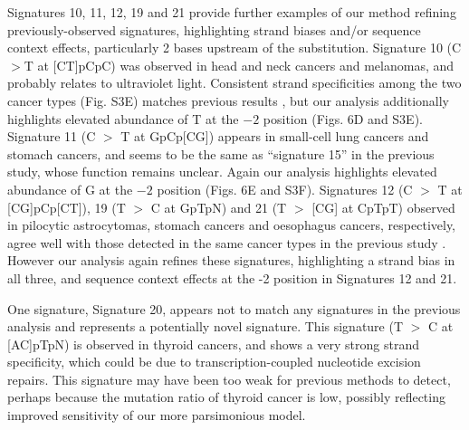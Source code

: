 \documentclass[10pt,letterpaper]{article}
\begin{document}
Signatures 10, 11, 12, 19 and 21 provide further examples
of our method refining previously-observed signatures, highlighting strand biases and/or sequence context effects,
particularly 2 bases upstream of the substitution.
Signature 10 (C $>$T at [CT]pCpC) was observed in head and neck cancers and melanomas, and probably relates to ultraviolet light.
Consistent strand specificities among the two cancer types (Fig. S3E) matches previous results \cite{pmid23318258}, 
but our analysis additionally highlights elevated abundance of T at the $-2$ position (Figs. 6D and S3E). 
Signature 11 (C $>$ T at GpCp[CG]) appears in small-cell lung cancers and stomach cancers,
and seems to be the same as ``signature 15'' in the previous study, whose function remains unclear. Again our analysis highlights elevated abundance of G at the $-2$ position (Figs. 6E and S3F).
Signatures 12 (C $>$ T at [CG]pCp[CT]), 19 (T $>$ C at GpTpN) and 21 (T $>$ [CG] at CpTpT) observed in pilocytic astrocytomas, stomach cancers and oesophagus cancers, respectively, agree well with those detected in the same cancer types in the previous study \cite{pmid23318258}. However our analysis again refines these signatures,
highlighting a strand bias in all three, and sequence context effects at the -2 position in Signatures 12 and 21.


One signature, Signature 20, appears not to match any signatures in the previous analysis \cite{pmid23318258} and represents a potentially novel signature. 
This signature (T $>$ C at [AC]pTpN) is observed in thyroid cancers, and shows a very strong strand specificity, which could be due to transcription-coupled nucleotide excision repairs.
This signature may have been too weak for previous
methods to detect, perhaps because the mutation ratio of thyroid cancer is low, possibly reflecting improved sensitivity of our more parsimonious model.
\end{document}
